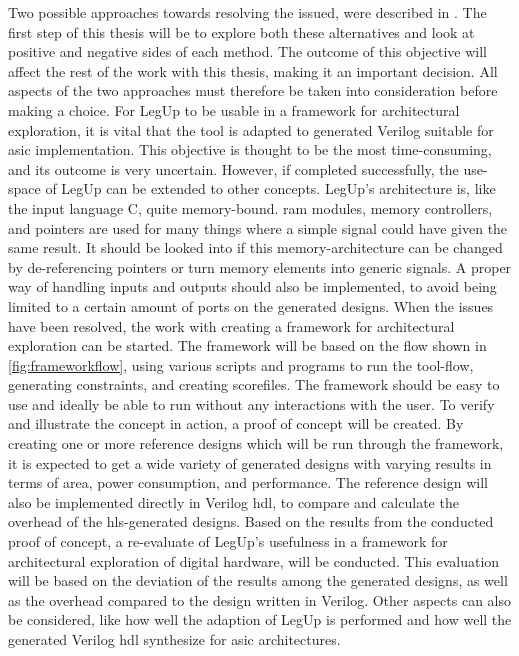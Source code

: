\begin{enumerate}
 Two possible approaches towards resolving the issued, were described in \cite{holm2015pro}. The first step of this thesis will be to explore both these alternatives and look at positive and negative sides of each method. The outcome of this objective will affect the rest of the work with this thesis, making it an important decision. All aspects of the two approaches must therefore be taken into consideration before making a choice.
 For LegUp to be usable in a framework for architectural exploration, it is vital that the tool is adapted to generated Verilog suitable for \gls{asic} implementation. This objective is thought to be the most time-consuming, and its outcome is very uncertain. However, if completed successfully, the use-space of LegUp can be extended to other concepts. LegUp’s architecture is, like the input language C, quite memory-bound. \gls{ram} modules, memory controllers, and pointers are used for many things where a simple signal could have given the same result. It should be looked into if this memory-architecture can be changed by de-referencing pointers or turn memory elements into generic signals. A proper way of handling inputs and outputs should also be implemented, to avoid being limited to a certain amount of ports on the generated designs.
 When the issues have been resolved, the work with creating a framework for architectural exploration can be started. The framework will be based on the flow shown in \cref{fig:frameworkflow}, using various scripts and programs to run the tool-flow, generating constraints, and creating scorefiles. The framework should be easy to use and ideally be able to run without any interactions with the user.
 To verify and illustrate the concept in action, a proof of concept will be created. By creating one or more reference designs which will be run through the framework, it is expected to get a wide variety of generated designs with varying results in terms of area, power consumption, and performance. The reference design will also be implemented directly in Verilog \gls{hdl}, to compare and calculate the overhead of the \gls{hls}-generated designs.
 Based on the results from the conducted proof of concept, a re-evaluate of LegUp's usefulness in a framework for architectural exploration of digital hardware, will be conducted. This evaluation will be based on the deviation of the results among the generated designs, as well as the overhead compared to the design written in Verilog. Other aspects can also be considered, like how well the adaption of LegUp is performed and how well the generated Verilog \gls{hdl} synthesize for \gls{asic} architectures.

\end{enumerate}
